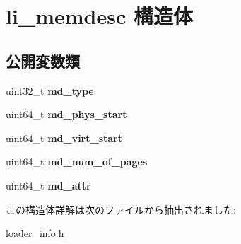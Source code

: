 \hypertarget{structli__memdesc}{}\section{li\+\_\+memdesc 構造体}
\label{structli__memdesc}
\subsection*{公開変数類}
\begin{DoxyCompactItemize}
\item 
\hypertarget{structli__memdesc_a39167d86533df726f0517b89dc33c494}{}uint32\+\_\+t {\bfseries md\+\_\+type}\label{structli__memdesc_a39167d86533df726f0517b89dc33c494}

\item 
\hypertarget{structli__memdesc_a551f2c14e7e093a92a0b320a58d07026}{}uint64\+\_\+t {\bfseries md\+\_\+phys\+\_\+start}\label{structli__memdesc_a551f2c14e7e093a92a0b320a58d07026}

\item 
\hypertarget{structli__memdesc_ab1bd6cd10e7e052250725b6ddeea8ade}{}uint64\+\_\+t {\bfseries md\+\_\+virt\+\_\+start}\label{structli__memdesc_ab1bd6cd10e7e052250725b6ddeea8ade}

\item 
\hypertarget{structli__memdesc_a6ce3696143305422f2505bf65b6303d2}{}uint64\+\_\+t {\bfseries md\+\_\+num\+\_\+of\+\_\+pages}\label{structli__memdesc_a6ce3696143305422f2505bf65b6303d2}

\item 
\hypertarget{structli__memdesc_a1baaa66ccbe9d119665e3352d30c7ee3}{}uint64\+\_\+t {\bfseries md\+\_\+attr}\label{structli__memdesc_a1baaa66ccbe9d119665e3352d30c7ee3}

\end{DoxyCompactItemize}


この構造体詳解は次のファイルから抽出されました\+:\begin{DoxyCompactItemize}
\item 
\hyperlink{loader__info_8h}{loader\+\_\+info.\+h}\end{DoxyCompactItemize}
